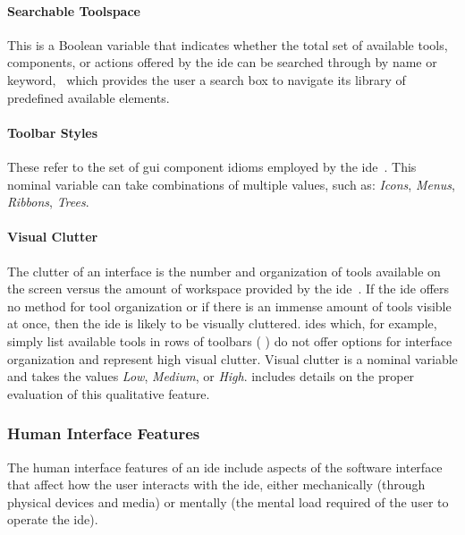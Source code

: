 \paragraph{Searchable Toolspace}
This is a Boolean variable that indicates whether the total set of
available tools, components, or actions offered by the \ac{ide} can be
searched through by name or keyword, \eg \cameleon~which provides the user
a search box to navigate its library of predefined available elements.


\paragraph{Toolbar Styles}
These refer to the set of \ac{gui} component idioms employed by the \ac{ide}~\cite{galitz2007}.
This nominal variable can take combinations of multiple values, such as:
\textsl{Icons}, \textsl{Menus}, \textsl{Ribbons}, \textsl{Trees}.


\paragraph{Visual Clutter}
The clutter of an interface is the number and organization of tools
available on the screen versus the amount of workspace provided by the
\ac{ide}~\cite{cooper2007,galitz2007}. If the \ac{ide} offers no method for
tool organization or if there is an immense amount of tools visible at
once, then the \ac{ide} is likely to be visually cluttered. \acp{ide}
which, for example, simply list available tools in rows of toolbars (\eg
{}) do not offer options for interface organization
and represent high visual clutter. Visual clutter is a nominal variable
and takes the values \textsl{Low}, \textsl{Medium}, or \textsl{High}.
 includes details on the proper evaluation of
this qualitative feature.


\subsubsection{Human Interface Features} \label{subsubsec:humaninterface}

The human interface features of an \ac{ide} include aspects of the software
interface that affect how the user interacts with the \ac{ide}, either
mechanically (\eg through physical devices and media) or mentally (\eg the
mental load required of the user to operate the \ac{ide}).


